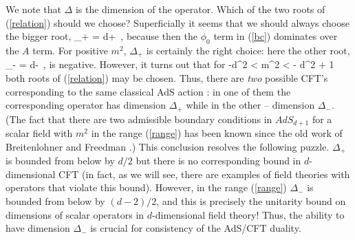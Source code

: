 \documentclass[12pt]{article}
\begin{document}
We note that $\Delta$ is the dimension of the operator.
Which of the two roots of (\ref{relation}) should we choose?
Superficially it seems that we should always choose
the bigger root,
\be
\label{dimen}
\Delta_+ = {d}+\ ,
\ee
because then the $\phi_0$ term in (\ref{bc}) dominates over the
$A$ term. For positive $m^2$, $\Delta_+$ is certainly the right
choice: here the other root, 
\be
\label{otherdimen}
\Delta_- = {d}-\ ,
\ee
is negative. However, it turns out
that for
\be \label{range}
-{d^2} < m^2 < - {d^2} + 1
\ee
both roots of (\ref{relation}) may be chosen. Thus, there are {\it two}
possible CFT's corresponding to the same classical AdS action
\cite{KWnew}:
in one of them the corresponding operator has dimension $\Delta_+$
while in the other -- dimension $\Delta_-$. (The fact that there are
two admissible boundary conditions in $AdS_{d+1}$ for a scalar field
with $m^2$ in the range (\ref{range}) has been known since the old work of
Breitenlohner and Freedman \cite{BF}.) 
This conclusion resolves the following
puzzle. $\Delta_+$ is bounded from below by $d/2$ but there is
no corresponding bound in $d$-dimensional CFT (in fact, as we will see,
there are examples of field theories with operators that violate this
bound). However, in the range (\ref{range}) $\Delta_-$ is bounded
from below by $(d-2)/2$, and this is precisely the unitarity bound
on dimensions of scalar operators
in $d$-dimensional field theory! Thus, the ability to have dimension
$\Delta_-$ is crucial for consistency of the AdS/CFT duality.
\end{document}
